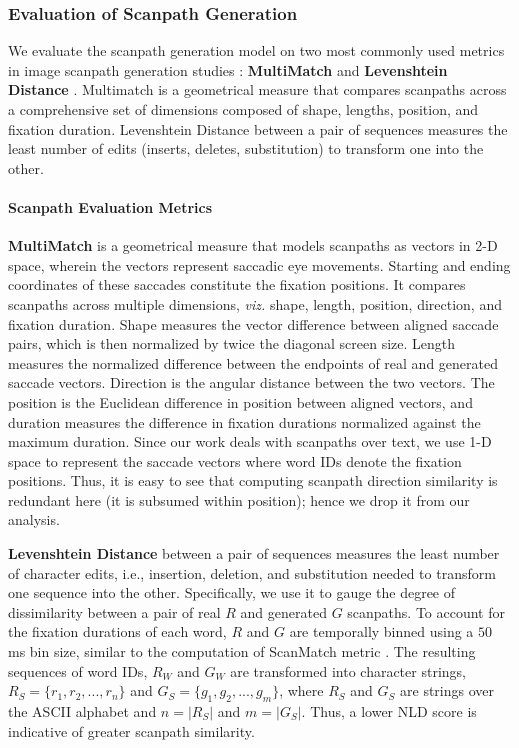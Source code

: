 \subsubsection{Evaluation of Scanpath Generation}
\label{sec:Evaluation of Scanpath Generation}
We evaluate the scanpath generation model on two most commonly used metrics in image scanpath generation studies \cite{sun2019visual,chen2018scanpath,de2022scanpathnet,kummerer2022deepgaze}: \textbf{MultiMatch} \cite{jarodzka2010vector} and \textbf{Levenshtein Distance} \cite{levenshtein1965leveinshtein}. Multimatch is a geometrical measure that compares scanpaths across a comprehensive set of dimensions composed of shape, lengths, position, and fixation duration. Levenshtein Distance between a pair of sequences measures the least number of edits (inserts, deletes, substitution) to transform one into the other.

\paragraph{Scanpath Evaluation Metrics}
\label{sec:appendix_scanpath_metrics}

\textbf{MultiMatch} is a geometrical measure that models scanpaths as vectors in 2-D space, wherein the vectors represent saccadic eye movements. Starting and ending coordinates of these saccades constitute the fixation positions. It compares scanpaths across multiple dimensions, \textit{viz.} shape, length, position, direction, and fixation duration. Shape measures the vector difference between aligned saccade pairs, which is then normalized by twice the diagonal screen size. Length measures the normalized difference between the endpoints of real and generated saccade vectors. Direction is the angular distance between the two vectors. The position is the Euclidean difference in position between aligned vectors, and duration measures the difference in fixation durations normalized against the maximum duration. Since our work deals with scanpaths over text, we use 1-D space to represent the saccade vectors where word IDs denote the fixation positions. Thus, it is easy to see that computing scanpath direction similarity is redundant here (it is subsumed within position); hence we drop it from our analysis. 


\textbf{Levenshtein Distance} between a pair of sequences measures the least number of character edits, i.e., insertion, deletion, and substitution needed to transform one sequence into the other.
Specifically, we use it to gauge the degree of dissimilarity between a pair of real $R$ and generated $G$ scanpaths. To account for the fixation durations of each word, $R$ and $G$ are temporally binned using a $50$ ms bin size, similar to the computation of ScanMatch metric \cite{cristino2010scanmatch}. The resulting sequences of word IDs, $R_W$ and $G_W$ are transformed into character strings, $R_S = \{r_1, r_2, ..., r_n\}$ and $G_S = \{g_1, g_2, ...,g_m\}$, where $R_S$ and $G_S$ are strings over the ASCII alphabet and $n = |R_S|$ and $m = |G_S|$.
Thus, a lower NLD score is indicative of greater scanpath similarity. 



